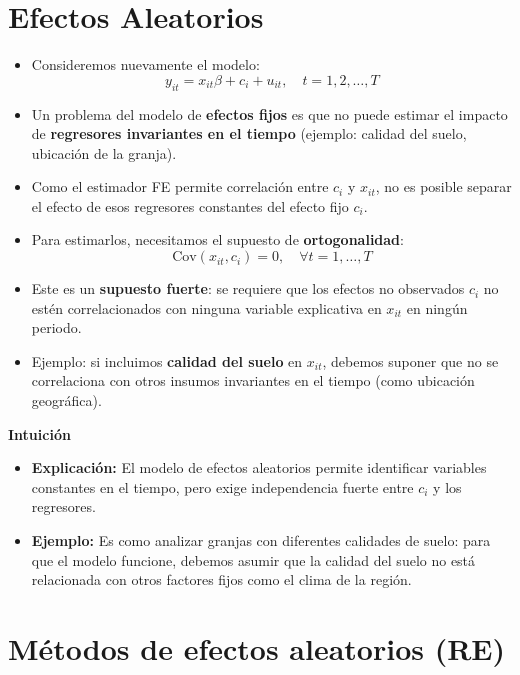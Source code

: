 \documentclass[12pt]{article}
\begin{document}
\section*{\noindent\textbf{Efectos Aleatorios}}

\begin{itemize}
    \item Consideremos nuevamente el modelo:
    \[
    y_{it} = x_{it}\beta + c_i + u_{it}, \quad t = 1,2,\ldots,T
    \]
    
    \item Un problema del modelo de \textbf{efectos fijos} es que no puede estimar el impacto de \textbf{regresores invariantes en el tiempo} (ejemplo: calidad del suelo, ubicación de la granja).
    
    \item Como el estimador FE permite correlación entre $c_i$ y $x_{it}$, no es posible separar el efecto de esos regresores constantes del efecto fijo $c_i$.
    
    \item Para estimarlos, necesitamos el supuesto de \textbf{ortogonalidad}:  
    \[
    \text{Cov}(x_{it}, c_i) = 0, \quad \forall t=1,\ldots,T
    \]
    
    \item Este es un \textbf{supuesto fuerte}: se requiere que los efectos no observados $c_i$ no estén correlacionados con ninguna variable explicativa en $x_{it}$ en ningún periodo.
    
    \item Ejemplo: si incluimos \textbf{calidad del suelo} en $x_{it}$, debemos suponer que no se correlaciona con otros insumos invariantes en el tiempo (como ubicación geográfica).
\end{itemize}

\noindent\textbf{Intuición}
\begin{itemize}
    \item \textbf{Explicación:} El modelo de efectos aleatorios permite identificar variables constantes en el tiempo, pero exige independencia fuerte entre $c_i$ y los regresores.
    \item \textbf{Ejemplo:} Es como analizar granjas con diferentes calidades de suelo: para que el modelo funcione, debemos asumir que la calidad del suelo no está relacionada con otros factores fijos como el clima de la región.
\end{itemize}

\section*{\noindent\textbf{Métodos de efectos aleatorios (RE)}}
\end{document}
